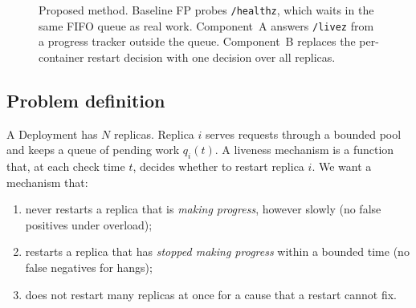 \documentclass[conference]{IEEEtran}
\begin{document}
\begin{figure}[t]
\caption{Proposed method. Baseline FP probes \texttt{/healthz}, which
waits in the same FIFO queue as real work. Component~A answers
\texttt{/livez} from a progress tracker outside the queue. Component~B
replaces the per-container restart decision with one decision over all
replicas.}
\label{fig:arch}
\end{figure}

\subsection{Problem definition}
A Deployment has $N$ replicas. Replica $i$ serves requests through a
bounded pool and keeps a queue of pending work $q_i(t)$. A liveness
mechanism is a function that, at each check time $t$, decides whether
to restart replica $i$. We want a mechanism that:
\begin{enumerate}
\item never restarts a replica that is \emph{making progress}, however
  slowly (no false positives under overload);
\item restarts a replica that has \emph{stopped making progress} within
  a bounded time (no false negatives for hangs);
\item does not restart many replicas at once for a cause that a restart
  cannot fix.
\end{enumerate}
\end{document}

